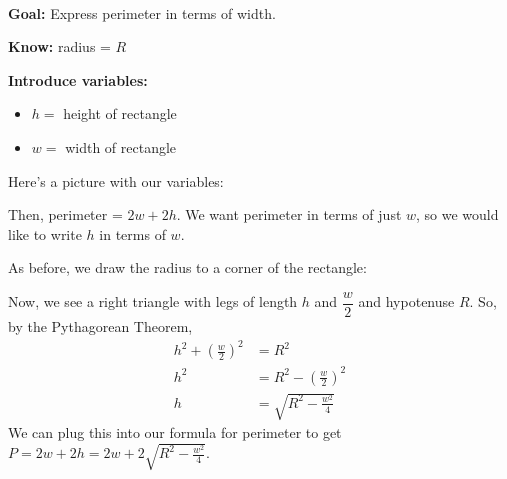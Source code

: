 \documentclass{article}
\begin{document}
\begin{enumerate}[resume]
\begin{enumerate}
    \begin{solution}\

      \textbf{Goal:} Express perimeter in terms of width.

      \textbf{Know:} radius = $R$

      \textbf{Introduce variables:}
      \begin{itemize}[nosep]
      \item $h = $ height of rectangle
      \item $w = $ width of rectangle 
      \end{itemize}

      Here's a picture with our variables:
      \begin{center}
      \end{center}
      Then, perimeter = $2w+2h$. We want perimeter in terms of just $w$, so we would like to write $h$ in terms of $w$.

      As before, we draw the radius to a corner of the rectangle:
      \begin{center}
      \end{center}
      Now, we see a right triangle with legs of length $h$ and $\dfrac{w}{2}$ and hypotenuse $R$. So, by the Pythagorean Theorem,
      \begin{align*}
        h^2 + \left( \frac{w}{2} \right)^2 &= R^2 \\
        h^2 &= R^2 - \left( \frac{w}{2} \right)^2  \\
        h &= \sqrt{R^2 - \frac{w^2}{4}}
      \end{align*}
      We can plug this into our formula for perimeter to get $P = 2w+2h = \boxed{2w + 2 \sqrt{R^2 - \frac{w^2}{4}}}$.
    \end{solution}


\end{enumerate}
\end{enumerate}
\end{document}
